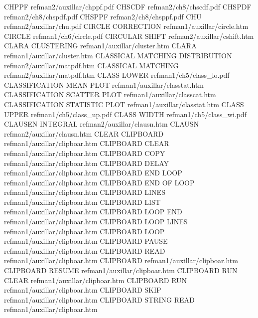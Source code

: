 CHPPF                                   refman2/auxillar/chppf.pdf
CHSCDF                                  refman2/ch8/chscdf.pdf
CHSPDF                                  refman2/ch8/chspdf.pdf
CHSPPF                                  refman2/ch8/chsppf.pdf
CHU                                     refman2/auxillar/chu.pdf
CIRCLE CORRECTION                       refman1/auxillar/circle.htm
CIRCLE                                  refman1/ch6/circle.pdf
CIRCULAR SHIFT                          refman2/auxillar/cshift.htm
CLARA CLUSTERING                        refman1/auxillar/cluster.htm
CLARA                                   refman1/auxillar/cluster.htm
CLASSICAL MATCHING DISTRIBUTION         refman2/auxillar/matpdf.htm
CLASSICAL MATCHING                      refman2/auxillar/matpdf.htm
CLASS LOWER                             refman1/ch5/class_lo.pdf
CLASSIFICATION MEAN PLOT                refman1/auxillar/classtat.htm
CLASSIFICATION SCATTER PLOT             refman1/auxillar/classcat.htm
CLASSIFICATION STATISTIC PLOT           refman1/auxillar/classtat.htm
CLASS UPPER                             refman1/ch5/class_up.pdf
CLASS WIDTH                             refman1/ch5/class_wi.pdf
CLAUSEN INTEGRAL                        refman2/auxillar/clausn.htm
CLAUSN                                  refman2/auxillar/clausn.htm
CLEAR CLIPBOARD                         refman1/auxillar/clipboar.htm
CLIPBOARD CLEAR                         refman1/auxillar/clipboar.htm
CLIPBOARD COPY                          refman1/auxillar/clipboar.htm
CLIPBOARD DELAY                         refman1/auxillar/clipboar.htm
CLIPBOARD END LOOP                      refman1/auxillar/clipboar.htm
CLIPBOARD END OF LOOP                   refman1/auxillar/clipboar.htm
CLIPBOARD LINES                         refman1/auxillar/clipboar.htm
CLIPBOARD LIST                          refman1/auxillar/clipboar.htm
CLIPBOARD LOOP END                      refman1/auxillar/clipboar.htm
CLIPBOARD LOOP LINES                    refman1/auxillar/clipboar.htm
CLIPBOARD LOOP                          refman1/auxillar/clipboar.htm
CLIPBOARD PAUSE                         refman1/auxillar/clipboar.htm
CLIPBOARD READ                          refman1/auxillar/clipboar.htm
CLIPBOARD                               refman1/auxillar/clipboar.htm
CLIPBOARD RESUME                        refman1/auxillar/clipboar.htm
CLIPBOARD RUN CLEAR                     refman1/auxillar/clipboar.htm
CLIPBOARD RUN                           refman1/auxillar/clipboar.htm
CLIPBOARD SKIP                          refman1/auxillar/clipboar.htm
CLIPBOARD STRING READ                   refman1/auxillar/clipboar.htm
